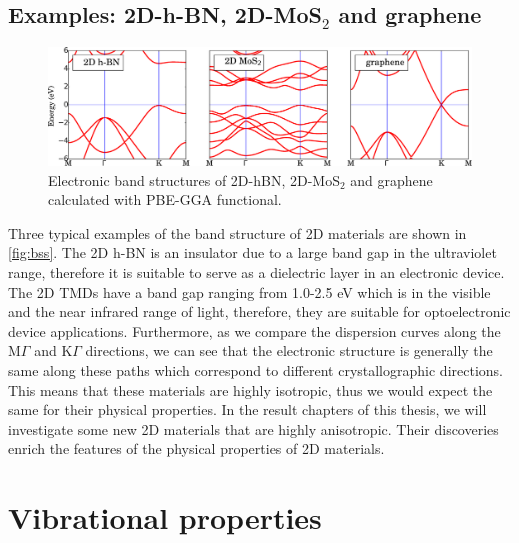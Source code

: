 \subsection{Examples: 2D-h-BN, 2D-MoS$_2$ and graphene}
\begin{figure}[htbp!] 
\centering  
\includegraphics[width=\textwidth]{bss.eps}
\caption{Electronic band structures of 2D-hBN, 2D-MoS$_2$ and graphene calculated with PBE-GGA functional. }  
\label{fig:bss}
\end{figure} 
Three typical examples of the band structure of 2D materials are shown in \autoref{fig:bss}. The 2D h-BN is an insulator due to a large band gap in the ultraviolet range, therefore it is suitable to serve as a dielectric layer in an electronic device. The 2D TMDs have a band gap ranging from 1.0-2.5 eV which is in the visible and the near infrared range of light, therefore, they are suitable for optoelectronic device applications. Furthermore, as we compare the dispersion curves along the $\mathrm{M}\Gamma$ and $\mathrm{K}\Gamma$ directions, we can see that the electronic structure is generally the same along these paths which correspond to different crystallographic directions. This means that these materials are highly isotropic, thus we would expect the same for their physical properties. In the result chapters of this thesis, we will investigate some new 2D materials that are highly anisotropic. Their discoveries enrich the features of the physical properties of 2D materials.

\section{Vibrational properties}

